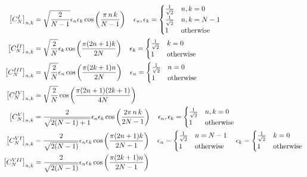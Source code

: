 \documentclass[11pt,a4paper,openright,twoside]{book}
\numberwithin{equation}{section} %
\numberwithin{figure}{section} %
\numberwithin{table}{section} %
\begin{document}
\begin{align}
	\small
	{\left[C_{N}^{I} \right]}_{n,k} & =
	\sqrt{\frac{2}{N-1}}\epsilon_n\epsilon_k\cos\left(\frac{\pi\,n\,k}{N-1}\right)
	\quad
	\epsilon_n,\epsilon_k =
	\begin{cases}
		\frac{1}{\sqrt{2}} & n, k = 0 \\
		\frac{1}{\sqrt{2}} & n, k = N-1 \\
		1 & \text{otherwise}
	\end{cases}
	\\ %
	{\left[C_{N}^{II} \right]}_{n,k} & =
	\sqrt{\frac{2}{N}}\epsilon_k\cos\left(\frac{\pi(2n+1)k}{2N}\right)
	\quad
	\epsilon_k =
	\begin{cases}
		\frac{1}{\sqrt{2}} & k = 0 \\
		1 & \text{otherwise}
	\end{cases}
	\\ %
	{\left[C_{N}^{III} \right]}_{n,k} & =
	\sqrt{\frac{2}{N}}\epsilon_n\cos\left(\frac{\pi(2k+1)n}{2N}\right)
	\quad
	\epsilon_n =
	\begin{cases}
		\frac{1}{\sqrt{2}} & n = 0 \\
		1 & \text{otherwise}
	\end{cases}
	\\ %
	{\left[C_{N}^{IV} \right]}_{n,k} & =
	\sqrt{\frac{2}{N}}\cos\left(\frac{\pi(2n+1)(2k+1)}{4N}\right)
	\\ %
	{\left[C_{N}^{V} \right]}_{n,k} & =
	\frac{2}{\sqrt{2(N-1)+1}}\epsilon_n\epsilon_k\cos\left(\frac{2\pi\,n\,k}{2N-1}\right)
	\quad
	\epsilon_n,\epsilon_k =
	\begin{cases}
		\frac{1}{\sqrt{2}} & n, k = 0 \\
		1 & \text{otherwise}
	\end{cases}
	\\ %
	{\left[C_{N}^{VI} \right]}_{n,k} & =
	\frac{2}{\sqrt{2(N-1)}}\epsilon_n\epsilon_k\cos\left(\frac{\pi(2n+1)k}{2N-1}\right)
	\quad
	\epsilon_n =
	\begin{cases}
		\frac{1}{\sqrt{2}} & n = N-1 \\
		1 & \text{otherwise}
	\end{cases}
	\quad
	\epsilon_k =
	\begin{cases}
		\frac{1}{\sqrt{2}} & k = 0 \\
		1 & \text{otherwise}
	\end{cases}
	\\ %
	{\left[C_{N}^{VII} \right]}_{n,k} & =
	\frac{2}{\sqrt{2(N-1)}}\epsilon_n\epsilon_k\cos\left(\frac{\pi(2k+1)n}{2N-1}\right)

\end{align}
\end{document}
